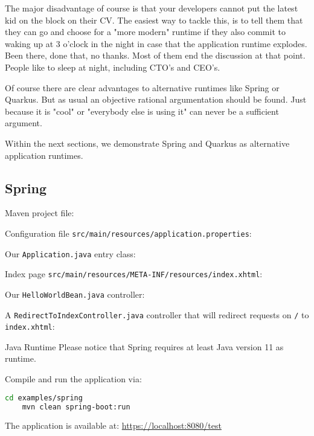 The major disadvantage of course is that your developers cannot put the latest kid on the block on their CV.
The easiest way to tackle this,
is to tell them that they can go and choose for a "more modern" runtime if they also commit to waking up at 3 o'clock in the night in case that the application runtime explodes.
Been there, done that, no thanks.
Most of them end the discussion at that point.
People like to sleep at night, including CTO's and CEO's.

Of course there are clear advantages to alternative runtimes like Spring or Quarkus.
But as usual an objective rational argumentation should be found.
Just because it is "cool" or "everybody else is using it" can never be a sufficient argument.

Within the next sections, we demonstrate Spring and Quarkus as alternative application runtimes.

\subsection{Spring}

Maven project file:


Configuration file \texttt{src/main/resources/application.properties}:


Our \texttt{Application.java} entry class:


Index page \texttt{src/main/resources/META-INF/resources/index.xhtml}:


Our \texttt{HelloWorldBean.java} controller:


A \texttt{RedirectToIndexController.java} controller that will redirect requests on \texttt{/} to \texttt{index.xhtml}:


\begin{TIP}{Java Runtime}
	Please notice that Spring requires at least Java version 11 as runtime.
\end{TIP}

Compile and run the application via:
\begin{lstlisting}[language=bash]
	cd examples/spring
	mvn clean spring-boot:run
\end{lstlisting}
The application is available at:
\url{https://localhost:8080/test}



